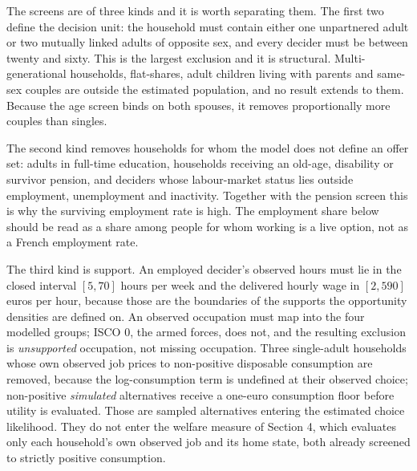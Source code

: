 \documentclass[11pt,a4paper]{article}
\begin{document}
The screens are of three kinds and it is worth separating them. The first two define the decision unit: the household must contain either one unpartnered adult or two mutually linked adults of opposite sex, and every decider must be between twenty and sixty. This is the largest exclusion and it is structural. Multi-generational households, flat-shares, adult children living with parents and same-sex couples are outside the estimated population, and no result extends to them. Because the age screen binds on both spouses, it removes proportionally more couples than singles.

The second kind removes households for whom the model does not define an offer set: adults in full-time education, households receiving an old-age, disability or survivor pension, and deciders whose labour-market status lies outside employment, unemployment and inactivity. Together with the pension screen this is why the surviving employment rate is high. The employment share below should be read as a share among people for whom working is a live option, not as a French employment rate.

The third kind is support. An employed decider's observed hours must lie in the closed interval \([5, 70]\) hours per week and the delivered hourly wage in \([2, 590]\) euros per hour, because those are the boundaries of the supports the opportunity densities are defined on. An observed occupation must map into the four modelled groups; ISCO 0, the armed forces, does not, and the resulting exclusion is \emph{unsupported} occupation, not missing occupation. Three single-adult households whose own observed job prices to non-positive disposable consumption are removed, because the log-consumption term is undefined at their observed choice; non-positive \emph{simulated} alternatives receive a one-euro consumption floor before utility is evaluated. Those are sampled alternatives entering the estimated choice likelihood. They do not enter the welfare measure of Section 4, which evaluates only each household's own observed job and its home state, both already screened to strictly positive consumption.
\end{document}
